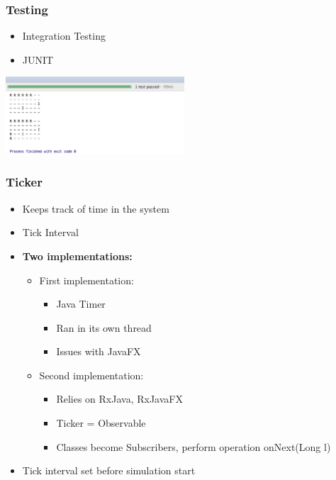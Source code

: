 \documentclass{beamer}
\begin{document}
       \begin{frame}
      	  \frametitle{Testing}
      	    \begin{itemize}
      	    \item Integration Testing
      	    \item JUNIT
      	    \end{itemize}
	 \includegraphics[width=0.5\textwidth, center]{test_mapgrid}
      	  \end{frame}
	  
	  \begin{frame}
      	  \frametitle{Ticker}
      	    \begin{itemize}
      	    \item Keeps track of time in the system
      	    \item Tick Interval
	    \item \textbf{Two implementations:}
	    	\begin{itemize}
	    		\item First implementation:
	    		\begin{itemize}
	    			\item Java Timer
				\item Ran in its own thread
				\item Issues with JavaFX
			\end{itemize}
	    		\item Second implementation:
	    	\begin{itemize}
	    		\item Relies on RxJava, RxJavaFX
	    		\item Ticker = Observable
	    		\item Classes become Subscribers, perform operation onNext(Long l)
	    	\end{itemize}
	    \end{itemize}
      	    \item Tick interval set before simulation start
	    \end{itemize}
      	  \end{frame}
\end{document}
